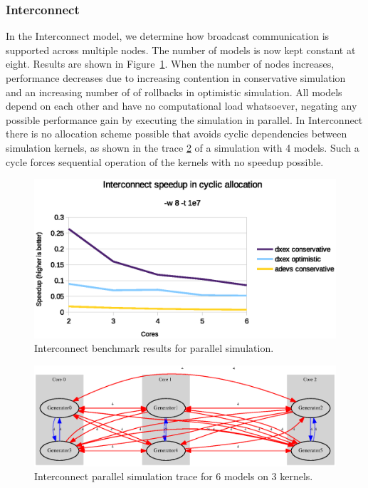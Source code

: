 \subsubsection{Interconnect}\label{subsec:parallelinterconnect}
In the Interconnect model, we determine how broadcast communication is supported across multiple nodes.
The number of models is now kept constant at eight.
Results are shown in Figure~\ref{fig:interconnect_benchmark_parallel}.
When the number of nodes increases, performance decreases due to increasing contention in conservative simulation and an increasing number of of rollbacks in optimistic simulation.
All models depend on each other and have no computational load whatsoever, negating any possible performance gain by executing the simulation in parallel.
In Interconnect there is no allocation scheme possible that avoids cyclic dependencies between simulation kernels, as shown in the trace \ref{fig:interconnect_allocation_parallel} of a simulation with 4 models. Such a cycle forces sequential operation of the kernels with no speedup possible.

\begin{figure}
	\center
	\includegraphics[width=\plotfraction\columnwidth]{fig/interconnect_parallel.eps}
	\caption{Interconnect benchmark results for parallel simulation.}
	\label{fig:interconnect_benchmark_parallel}
\end{figure}
\begin{figure}
	\center
	\includegraphics[width=\plotfraction\columnwidth]{fig/interconnect_parallel_allocation.eps}
	\caption{Interconnect parallel simulation trace for 6 models on 3 kernels.}
	\label{fig:interconnect_allocation_parallel}
\end{figure}

